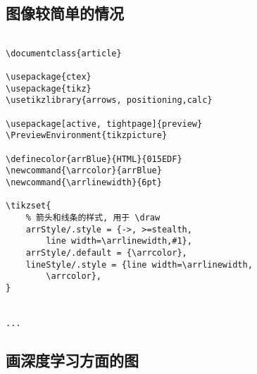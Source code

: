 \subsection{图像较简单的情况}

\begin{verbatim}
	
\documentclass{article}

\usepackage{ctex}
\usepackage{tikz}
\usetikzlibrary{arrows, positioning,calc}

\usepackage[active, tightpage]{preview}
\PreviewEnvironment{tikzpicture}

\definecolor{arrBlue}{HTML}{015EDF}
\newcommand{\arrcolor}{arrBlue}
\newcommand{\arrlinewidth}{6pt}

\tikzset{
	% 箭头和线条的样式, 用于 \draw
	arrStyle/.style = {->, >=stealth, 
		line width=\arrlinewidth,#1},
	arrStyle/.default = {\arrcolor},
	lineStyle/.style = {line width=\arrlinewidth, 
		\arrcolor},
}


...

\end{verbatim}

\subsection{画深度学习方面的图}

